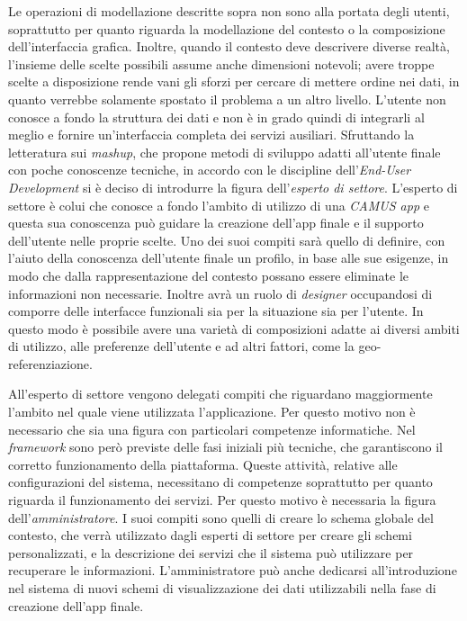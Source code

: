 Le operazioni di modellazione descritte sopra non sono alla portata degli utenti, soprattutto per quanto riguarda la modellazione del contesto o la composizione dell'interfaccia grafica. Inoltre, quando il contesto deve descrivere diverse realtà, l'insieme delle scelte possibili assume anche dimensioni notevoli; avere troppe scelte a disposizione rende vani gli sforzi per cercare di mettere ordine nei dati, in quanto verrebbe solamente spostato il problema a un altro livello. L'utente non conosce a fondo la struttura dei dati e non è in grado quindi di integrarli al meglio e fornire un'interfaccia completa dei servizi ausiliari. Sfruttando la letteratura sui \textit{mashup}, che propone metodi di sviluppo adatti all'utente finale con poche conoscenze tecniche, in accordo con le discipline dell'\emph{End-User Development} \cite{Cappiello:2015:UAE:2788341.2735632} si è deciso di introdurre la figura dell'\emph{esperto di settore}. L'esperto di settore è colui che conosce a fondo l'ambito di utilizzo di una \emph{CAMUS app} e questa sua conoscenza può guidare la creazione dell'app finale e il supporto dell'utente nelle proprie scelte. Uno dei suoi compiti sarà quello di definire, con l'aiuto della conoscenza dell'utente finale un profilo, in base alle sue esigenze, in modo che dalla rappresentazione del contesto possano essere eliminate le informazioni non necessarie. Inoltre avrà un ruolo di \emph{designer} occupandosi di comporre delle interfacce funzionali sia per la situazione sia per l'utente. In questo modo è possibile avere una varietà di composizioni adatte ai diversi ambiti di utilizzo, alle preferenze dell'utente e ad altri fattori, come la geo-referenziazione.

All'esperto di settore vengono delegati compiti che riguardano maggiormente l'ambito nel quale viene utilizzata l'applicazione. Per questo motivo non è necessario che sia una figura con particolari competenze informatiche. Nel \emph{framework} sono però previste delle fasi iniziali più tecniche, che garantiscono il corretto funzionamento della piattaforma. Queste attività, relative alle configurazioni del sistema, necessitano di competenze soprattutto per quanto riguarda il funzionamento dei servizi. Per questo motivo è necessaria la figura dell'\emph{amministratore}. I suoi compiti sono quelli di creare lo schema globale del contesto, che verrà utilizzato dagli esperti di settore per creare gli schemi personalizzati, e la descrizione dei servizi che il sistema può utilizzare per recuperare le informazioni. L'amministratore può anche dedicarsi all'introduzione nel sistema di nuovi schemi di visualizzazione dei dati utilizzabili nella fase di creazione dell'app finale.

